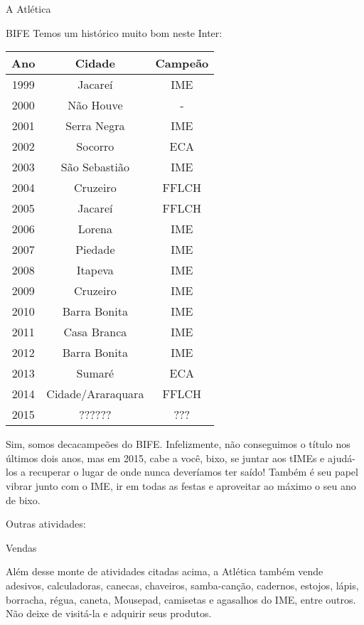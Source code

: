 \begin{secao}{A Atlética}
\begin{subsecao}{BIFE}
Temos um histórico muito bom neste Inter:
\begin{center}
	\begin{tabular}{c|c|c}
	  Ano & Cidade & Campeão\\
	  \hline
	  1999 & Jacareí & IME\\
	  2000 & Não Houve & - \\
	  2001 & Serra Negra & IME\\
	  2002 & Socorro & ECA\\
	  2003 & São Sebastião & IME\\
	  2004 & Cruzeiro & FFLCH\\
	  2005 & Jacareí & FFLCH\\
	  2006 & Lorena & IME\\
	  2007 & Piedade & IME\\
	  2008 & Itapeva & IME\\
	  2009 & Cruzeiro & IME\\
	  2010 & Barra Bonita & IME\\
	  2011 & Casa Branca & IME\\
	  2012 & Barra Bonita & IME\\
	  2013 & Sumaré & ECA\\
	  2014 & Cidade/Araraquara & FFLCH\\
	  2015 & ?????? & ???
	\end{tabular}
\end{center}

Sim, somos decacampeões do BIFE.
Infelizmente, não conseguimos o título nos últimos dois anos, mas
em 2015, cabe a você, bixo, se juntar aos tIMEs e ajudá-los a recuperar o lugar %
de onde nunca deveríamos ter saído! Também é seu papel vibrar junto com o IME,
ir em todas as festas e aproveitar ao máximo o seu ano de bixo.

\end{subsecao}

Outras atividades:

\begin{subsecao}{Vendas}

Além desse monte de atividades citadas acima, a Atlética também vende
adesivos, calculadoras, canecas, chaveiros, samba-canção, cadernos, estojos,
lápis, borracha, régua, caneta, Mousepad, camisetas e agasalhos do IME,
entre outros. Não deixe de visitá-la e adquirir seus produtos.

\end{subsecao}


\end{secao}
